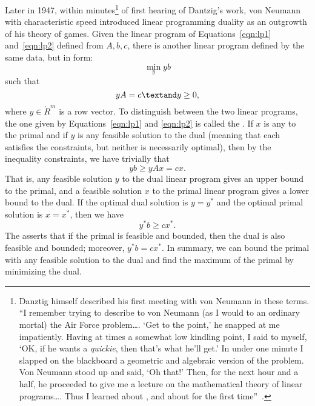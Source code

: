 Later in 1947, within minutes\footnote{Danztig himself described his
  first meeting with von Neumann in these terms.  ``I remember trying
  to describe to von Neumann (as I would to an ordinary mortal) the
  Air Force problem\dots.  `Get to the point,' he snapped at me
  impatiently.  Having at times a somewhat low kindling point, I said
  to myself, `OK, if he wants a {\it quickie}, then that's what he'll
  get.'  In under one minute I slapped on the blackboard a geometric
  and algebraic version of the problem.  Von Neumann stood up and
  said, `Oh that!'  Then, for the next hour and a half, he proceeded
  to give me a lecture on the mathematical theory of linear
  programs\dots.  Thus I learned about , and
  about  for the first time''~\cite{Dan91}.} of first
hearing of Dantzig's work, von Neumann with characteristic speed
introduced linear programming duality as an outgrowth of his theory of
games.  Given the linear program of Equations~\ref{eqn:lp1}
and~\ref{eqn:lp2} defined from $A,b,c$, there is another linear
program defined by the same data, but in  form:
\begin{equation}
\min_y {y b}
\end{equation}
such that
\begin{equation}
y A = c \textand  y \ge 0,
\end{equation}
where $y\in\ring{R}^m$ is a row vector.  To distinguish between the two linear
programs, the one given by Equations~\ref{eqn:lp1} and \ref{eqn:lp2}
is called the .  If $x$ is any  to the primal and if $y$ is any feasible solution to the
dual (meaning that each satisfies the constraints, but neither is
necessarily optimal), then by the inequality constraints, we have
trivially that
\[y b \ge y A x = c x.\]
That is, any feasible solution $y$ to the dual linear program gives an
upper bound to the primal, and a feasible solution $x$ to the primal
linear program gives a lower bound to the dual.  If the optimal dual
solution is $y=y^*$ and the optimal primal solution is $x=x^*$, then
we have
\[y^* b \ge c x^*.\]
The  asserts that if the
primal is feasible and bounded, then the dual is also feasible and
bounded; moreover, $y^* b = c x^*$.  In summary, we can bound the
primal with any feasible solution to the dual and find the maximum of
the primal by minimizing the dual.

